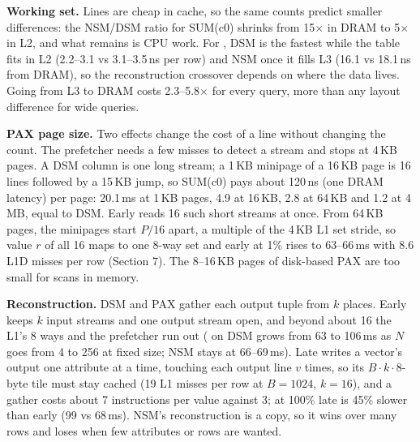 \textbf{Working set.} Lines are cheap in cache, so the same counts predict smaller differences:
the NSM/DSM ratio for SUM(c0) shrinks from 15$\times$ in DRAM to 5$\times$ in L2, and what
remains is CPU work. For , DSM is the fastest while the table fits in L2
(2.2--3.1 vs 3.1--3.5\,ns per row) and NSM once it fills L3 (16.1 vs 18.1\,ns from DRAM), so the
reconstruction crossover depends on where the data lives. Going from L3 to DRAM costs
2.3--5.8$\times$ for every query, more than any layout difference for wide queries.

\textbf{PAX page size.} Two effects change the cost of a line without changing the count. The
prefetcher needs a few misses to detect a stream and stops at 4\,KB pages. A DSM column is one
long stream; a 1\,KB minipage of a 16\,KB page is 16 lines followed by a 15\,KB jump, so
SUM(c0) pays about 120\,ns (one DRAM latency) per page: 20.1\,ms at 1\,KB pages, 4.9 at 16\,KB,
2.8 at 64\,KB and 1.2 at 4\,MB, equal to DSM. Early reads 16 such short streams at once. From
64\,KB pages, the minipages start $P/16$ apart, a multiple of the 4\,KB L1 set stride, so value
$r$ of all 16 maps to one 8-way set and early  at 1\% rises to 63--66\,ms with
8.6 L1D misses per row (Section 7). The 8--16\,KB pages of disk-based PAX are too small for
scans in memory.

\textbf{Reconstruction.} DSM and PAX gather each output tuple from $k$ places. Early keeps $k$
input streams and one output stream open, and beyond about 16 the L1's 8 ways and the
prefetcher run out ( on DSM grows from 63 to 106\,ms as $N$ goes from 4 to 256 at
fixed size; NSM stays at 66--69\,ms). Late writes a vector's output one attribute at a time,
touching each output line $v$ times, so its $B\cdot k\cdot 8$-byte tile must stay cached (19 L1
misses per row at $B{=}1024$, $k{=}16$), and a gather costs about 7 instructions per value
against 3; at 100\% late is 45\% slower than early (99 vs 68\,ms). NSM's reconstruction is a
copy, so it wins  over many rows and loses when few attributes or rows are
wanted.
